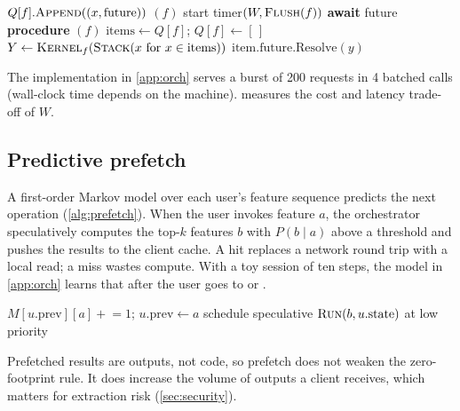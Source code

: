 \begin{algorithm}[htbp]
\caption{(feature \(f\), input \(x\))}\label{alg:batch}
\small
\begin{algorithmic}[1]
\State \(Q[f].\textsc{Append}((x, \text{future}))\)
 \((f)\)
 start timer\((W, \textsc{Flush}(f))\)
\EndIf
\State \Return \textbf{await} future
\Statex \textbf{procedure} \((f)\)
\State \(\text{items} \gets Q[f]\); \(Q[f] \gets [\,]\)
\State \(Y \gets \textsc{Kernel}_f(\textsc{Stack}(x \text{ for } x \in \text{items}))\) 
 \(\text{item.future.Resolve}(y)\) \EndFor
\end{algorithmic}
\end{algorithm}

The  implementation in \cref{app:orch} serves a burst of 200 requests in 4
batched calls (wall-clock time depends on the machine).  measures the cost
and latency trade-off of \(W\).

\subsection{Predictive prefetch}
A first-order Markov model over each user's feature sequence predicts the next operation
(\cref{alg:prefetch}). When the user invokes feature \(a\), the orchestrator speculatively
computes the top-\(k\) features \(b\) with \(P(b \mid a)\) above a threshold and pushes the
results to the client cache. A hit replaces a network round trip with a local read; a miss
wastes compute. With a toy session of ten steps, the model in \cref{app:orch} learns that
after  the user goes to  or .

\begin{algorithm}[htbp]
\caption{(user \(u\), feature \(a\))}\label{alg:prefetch}
\small
\begin{algorithmic}[1]
\State \(M[u.\text{prev}][a] \mathrel{+}= 1\); \(u.\text{prev} \gets a\)
   schedule speculative \(\textsc{Run}(b, u.\text{state})\) at low priority \EndIf
\EndFor
\end{algorithmic}
\end{algorithm}

Prefetched results are outputs, not code, so prefetch does not weaken the zero-footprint
rule. It does increase the volume of outputs a client receives, which matters for
extraction risk (\cref{sec:security}).
